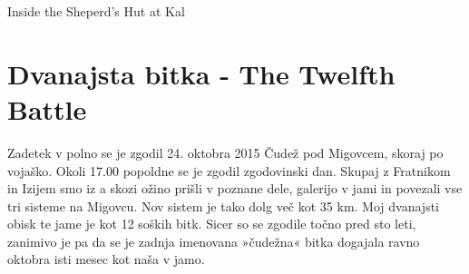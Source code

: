 \begin{marginfigure}
\checkoddpage \ifoddpage \forcerectofloat \else \forceversofloat \fi
\centering
{}
\caption{Inside the Sheperd's Hut at Kal \protect{}  }
\label{migovec in autumn}
\end{marginfigure}
\section{Dvanajsta bitka - The Twelfth Battle}

Zadetek v polno se je zgodil 24. oktobra 2015 Čudež pod Migovcem, skoraj po vojaško. Okoli 17.00 popoldne se je zgodil zgodovinski dan. Skupaj z Fratnikom in Izijem smo iz a skozi ožino prišli v poznane dele, galerijo v jami  in povezali vse tri sisteme na Migovcu. Nov sistem je tako dolg več kot 35 km. Moj dvanajsti obisk te jame je kot 12 soških bitk. Sicer so se zgodile točno pred sto leti, zanimivo je pa da se je zadnja imenovana »čudežna« bitka dogajala ravno oktobra isti mesec kot naša v jamo. 

